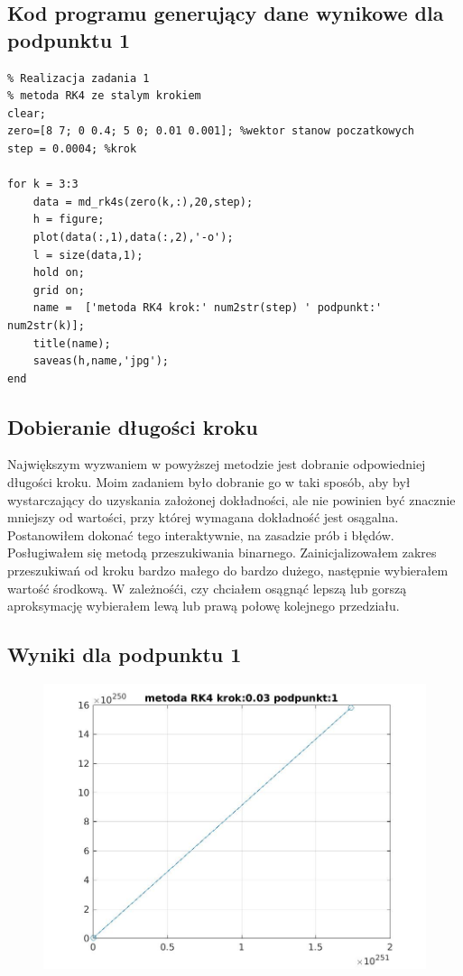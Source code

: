 \documentclass[a4paper, 12pt]{article}
\begin{document}
\subsection{Kod programu generujący dane wynikowe dla podpunktu 1}
\begin{lstlisting}
% Realizacja zadania 1 
% metoda RK4 ze stalym krokiem
clear; 
zero=[8 7; 0 0.4; 5 0; 0.01 0.001]; %wektor stanow poczatkowych
step = 0.0004; %krok

for k = 3:3
    data = md_rk4s(zero(k,:),20,step);
    h = figure;
    plot(data(:,1),data(:,2),'-o');
    l = size(data,1);
    hold on;
    grid on;
    name =  ['metoda RK4 krok:' num2str(step) ' podpunkt:' num2str(k)]; 
    title(name);
    saveas(h,name,'jpg');
end
\end{lstlisting}

\subsection{Dobieranie długości kroku}
Największym wyzwaniem w powyższej metodzie jest dobranie odpowiedniej długości kroku. Moim zadaniem było dobranie go w taki sposób, aby był wystarczający do uzyskania założonej dokładności, ale nie powinien być znacznie mniejszy od wartości, przy której wymagana dokładność jest osągalna. \\
Postanowiłem dokonać tego interaktywnie, na zasadzie prób i błędów. Posługiwałem się metodą przeszukiwania binarnego. Zainicjalizowałem zakres przeszukiwań od kroku bardzo małego do bardzo dużego, następnie wybierałem wartość środkową. W zależnośći, czy chciałem osągnąć lepszą lub gorszą aproksymację wybierałem lewą lub prawą połowę kolejnego przedziału.


\subsection{Wyniki dla podpunktu 1}
\begin{figure}[H]
\centering
\includegraphics[width = 15cm]{2d/metoda RK4 krok:0,03 podpunkt:1.jpg}
\end{figure}
\end{document}
